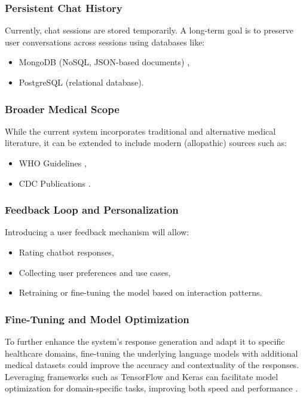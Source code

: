 \documentclass[12pt,a4paper]{report}
\begin{document}
\subsubsection{Persistent Chat History}
\label{Persistent Chat History}

Currently, chat sessions are stored temporarily. A long-term goal is to preserve user conversations across sessions using databases like:
\begin{itemize}
    \item MongoDB (NoSQL, JSON-based documents) \cite{mongodb},
    \item PostgreSQL (relational database).
\end{itemize}

\subsubsection{Broader Medical Scope}
\label{Broader Medical Scope}

While the current system incorporates traditional and alternative medical literature, it can be extended to include modern (allopathic) sources such as:
\begin{itemize}
    \item WHO Guidelines \cite{who_guidelines},
    \item CDC Publications \cite{cdc_publications}.
\end{itemize}

\subsubsection{Feedback Loop and Personalization}
\label{Feedback Loop and Personalization}

Introducing a user feedback mechanism will allow:
\begin{itemize}
    \item Rating chatbot responses,
    \item Collecting user preferences and use cases,
    \item Retraining or fine-tuning the model based on interaction patterns.
\end{itemize}

\subsubsection{Fine-Tuning and Model Optimization}
\label{Fine-Tuning and Model Optimization}

To further enhance the system's response generation and adapt it to specific healthcare domains, fine-tuning the underlying language models with additional medical datasets could improve the accuracy and contextuality of the responses. Leveraging frameworks such as TensorFlow and Keras can facilitate model optimization for domain-specific tasks, improving both speed and performance \cite{homl}.
\end{document}
